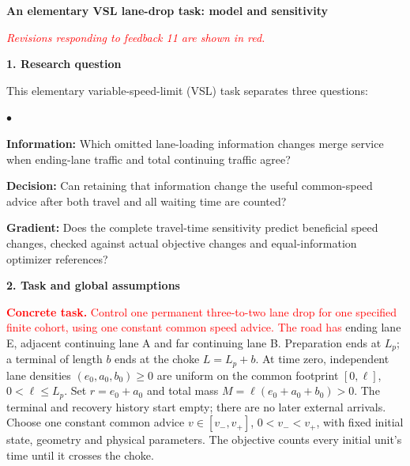 \documentclass[10pt,a4paper]{article}
\newcommand{\head}[1]{\par\vspace{4pt}\noindent\textbf{#1}\par\nobreak\vspace{1pt}}
\newcommand{\rev}[1]{\textcolor{red}{#1}}
\newenvironment{points}{\begin{list}{$\bullet$}{%
 \setlength{\leftmargin}{1.4em}\setlength{\labelwidth}{0.7em}%
 \setlength{\labelsep}{0.4em}\setlength{\itemsep}{2pt}%
 \setlength{\parsep}{0pt}\setlength{\topsep}{3pt}}}{\end{list}}
\begin{document}
\begin{center}
{\large\bfseries An elementary VSL lane-drop task: model and sensitivity}
\end{center}
\vspace{-5pt}
\rev{\textit{Revisions responding to feedback 11 are shown in red.}}

\head{1. Research question}
\begingroup\color{red}
This elementary variable-speed-limit (VSL) task separates three questions:
\begin{points}
\item \textbf{Information:} Which omitted lane-loading information changes
merge service when ending-lane traffic and total continuing traffic agree?
\item \textbf{Decision:} Can retaining that information change the useful
common-speed advice after both travel and all waiting time are counted?
\item \textbf{Gradient:} Does the complete travel-time sensitivity predict
beneficial speed changes, checked against actual objective changes and
equal-information optimizer references?
\end{points}
\endgroup

\head{2. Task and global assumptions}
\rev{\textbf{Concrete task.} Control one permanent three-to-two lane drop
for one specified finite cohort, using one constant common speed advice.}
\rev{The road has} ending lane E, adjacent continuing lane A
and far continuing lane B. Preparation ends at $L_p$; a terminal of length
$b$ ends at the choke $L=L_p+b$. At time zero, independent lane densities
$(e_0,a_0,b_0)\geq0$ are uniform on the common footprint $[0,\ell]$,
$0<\ell\leq L_p$. Set $r=e_0+a_0$ and total mass
$M=\ell(e_0+a_0+b_0)>0$. The terminal and recovery history start empty;
there are no later external arrivals. Choose one constant common advice
$v\in[v_-,v_+]$, $0<v_-<v_+$, with fixed initial state, geometry and physical parameters.
The objective counts every initial unit's time until it crosses the choke.
\end{document}
